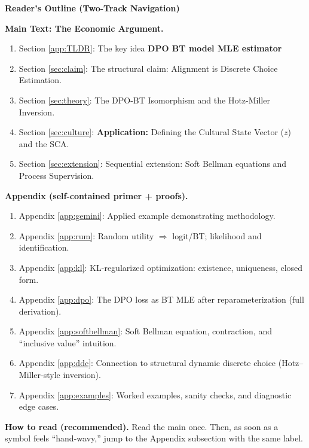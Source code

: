 \documentclass[11pt]{article}
\theoremstyle{plain}
\theoremstyle{definition}
\theoremstyle{remark}
\newcommand{\1}{\mathbf{1}}
\begin{document}
\clearpage
\thispagestyle{empty}
\begin{center}
  {\Large\bfseries Reader's Outline (Two-Track Navigation)}
\end{center}
\vspace{0.5em}

\noindent\textbf{Main Text: The Economic Argument.}
\begin{enumerate}[leftmargin=1.2cm, itemsep=0.2em]
  \item Section \ref{app:TLDR}: The key idea \textbf{DPO \iff BT model MLE estimator}
  \item Section \ref{sec:claim}: The structural claim: Alignment is Discrete Choice Estimation.
  \item Section \ref{sec:theory}: The DPO-BT Isomorphism and the Hotz-Miller Inversion.
  \item Section \ref{sec:culture}: \textbf{Application:} Defining the Cultural State Vector ($z$) and the SCA.
  \item Section \ref{sec:extension}: Sequential extension: Soft Bellman equations and Process Supervision.
\end{enumerate}

\vspace{0.6em}
\noindent\textbf{Appendix (self-contained primer + proofs).}
\begin{enumerate}[leftmargin=1.2cm, itemsep=0.2em]
  \item Appendix \ref{app:gemini}: Applied example demonstrating methodology.
  \item Appendix \ref{app:rum}: Random utility $\Rightarrow$ logit/BT; likelihood and identification.
  \item Appendix \ref{app:kl}: KL-regularized optimization: existence, uniqueness, closed form.
  \item Appendix \ref{app:dpo}: The DPO loss as BT MLE after reparameterization (full derivation).
  \item Appendix \ref{app:softbellman}: Soft Bellman equation, contraction, and ``inclusive value'' intuition.
  \item Appendix \ref{app:ddc}: Connection to structural dynamic discrete choice (Hotz--Miller-style inversion).
  \item Appendix \ref{app:examples}: Worked examples, sanity checks, and diagnostic edge cases.
\end{enumerate}

\vspace{1.0em}
\noindent\textbf{How to read (recommended).} Read the main once. Then, as soon as a symbol feels ``hand-wavy,'' jump to the Appendix subsection with the same label.
\end{document}
